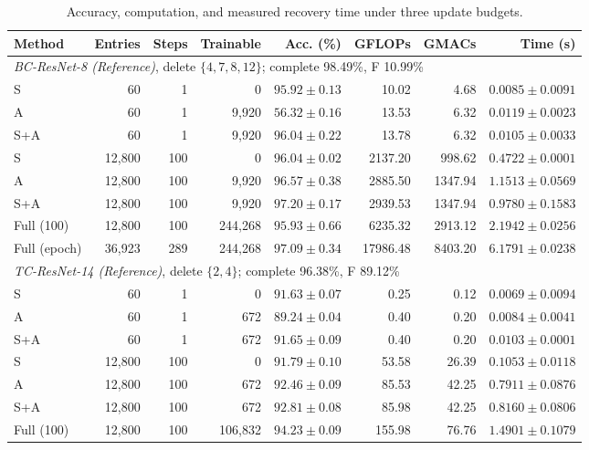 \begin{table}[htbp]
\caption{Accuracy, computation, and measured recovery time under three update budgets.}
\label{tab:matched_recovery_budget}
\centering\small
\setlength{\tabcolsep}{3pt}
\begin{tabular*}{\linewidth}{@{\extracolsep{\fill}}lrrrrrrr@{}}
\toprule
Method & Entries & Steps & Trainable & Acc. (\%) & GFLOPs & GMACs & Time (s) \\
\midrule
\multicolumn{8}{l}{\textit{BC-ResNet-8 (Reference)}, delete $\{4,7,8,12\}$; complete 98.49\%, F 10.99\%} \\
S & 60 & 1 & 0 & $95.92\pm0.13$ & 10.02 & 4.68 & $0.0085\pm0.0091$ \\
A & 60 & 1 & 9,920 & $56.32\pm0.16$ & 13.53 & 6.32 & $0.0119\pm0.0023$ \\
S+A & 60 & 1 & 9,920 & $96.04\pm0.22$ & 13.78 & 6.32 & $0.0105\pm0.0033$ \\
S & 12,800 & 100 & 0 & $96.04\pm0.02$ & 2137.20 & 998.62 & $0.4722\pm0.0001$ \\
A & 12,800 & 100 & 9,920 & $96.57\pm0.38$ & 2885.50 & 1347.94 & $1.1513\pm0.0569$ \\
S+A & 12,800 & 100 & 9,920 & $97.20\pm0.17$ & 2939.53 & 1347.94 & $0.9780\pm0.1583$ \\
Full (100) & 12,800 & 100 & 244,268 & $95.93\pm0.66$ & 6235.32 & 2913.12 & $2.1942\pm0.0256$ \\
Full (epoch) & 36,923 & 289 & 244,268 & $97.09\pm0.34$ & 17986.48 & 8403.20 & $6.1791\pm0.0238$ \\
\midrule
\multicolumn{8}{l}{\textit{TC-ResNet-14 (Reference)}, delete $\{2,4\}$; complete 96.38\%, F 89.12\%} \\
S & 60 & 1 & 0 & $91.63\pm0.07$ & 0.25 & 0.12 & $0.0069\pm0.0094$ \\
A & 60 & 1 & 672 & $89.24\pm0.04$ & 0.40 & 0.20 & $0.0084\pm0.0041$ \\
S+A & 60 & 1 & 672 & $91.65\pm0.09$ & 0.40 & 0.20 & $0.0103\pm0.0001$ \\
S & 12,800 & 100 & 0 & $91.79\pm0.10$ & 53.58 & 26.39 & $0.1053\pm0.0118$ \\
A & 12,800 & 100 & 672 & $92.46\pm0.09$ & 85.53 & 42.25 & $0.7911\pm0.0876$ \\
S+A & 12,800 & 100 & 672 & $92.81\pm0.08$ & 85.98 & 42.25 & $0.8160\pm0.0806$ \\
Full (100) & 12,800 & 100 & 106,832 & $94.23\pm0.09$ & 155.98 & 76.76 & $1.4901\pm0.1079$ \\

\end{tabular*}
\end{table}
